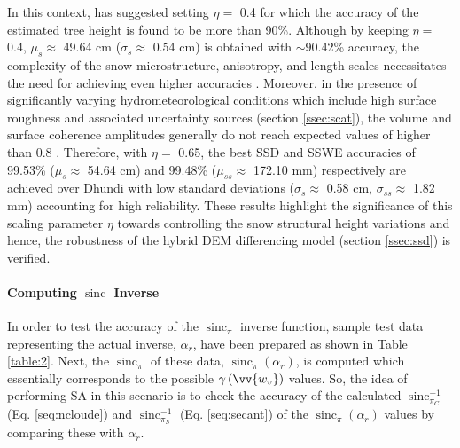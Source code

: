 \documentclass[review]{elsarticle}
\numberwithin{equation}{section}
\numberwithin{figure}{section}
\numberwithin{table}{section}
\DeclareMathOperator{\sinc}{sinc}
\begin{document}
In this context, \cite{Cloude2005} has suggested setting $\eta = $ 0.4 for which the accuracy of the estimated tree
height is found to be more than 90\%. Although by keeping $\eta = $ 0.4, $\mu_s \approx$ 49.64 cm ($\sigma_s \approx$ 0.54 cm) is obtained with $\sim$90.42\% accuracy, the complexity of the snow microstructure, anisotropy, and length scales necessitates the need for achieving even higher accuracies \citep{Leinss2016}. Moreover, in the presence of significantly varying hydrometeorological conditions which include high surface roughness and associated uncertainty sources (section \ref{ssec:scat}), the volume and surface coherence amplitudes generally do not reach expected values of higher than 0.8 \citep{Cloude2005, Kugler2015}. Therefore, with $\eta = $ 0.65, the best SSD and SSWE accuracies of 99.53\% ($\mu_s \approx$ 54.64 cm) and 99.48\% ($\mu_{ss} \approx$ 172.10 mm) respectively are achieved over Dhundi with low standard deviations ($\sigma_s \approx$ 0.58 cm, $\sigma_{ss} \approx$ 1.82 mm) accounting for high reliability. These results highlight the significance of this scaling parameter $\eta$ towards controlling the snow structural height variations \citep{Cloude2005, Cloude2010} and hence, the robustness of the hybrid DEM differencing model (section \ref{ssec:ssd}) is verified.

\paragraph*{Computing $\sinc$ Inverse}
In order to test the accuracy of the $\sinc_\pi$ inverse function, sample test data representing the actual inverse, $\alpha_r$, have been prepared as shown in Table \ref{table:2}. Next, the $\sinc_\pi$ of these data, $\sinc_{\pi}\left(\alpha_r\right)$, is computed which essentially corresponds to the possible $\gamma\left(\vv{w_v}\right)$ values. So, the idea of performing SA in this scenario is to check the accuracy of the calculated $\sinc_{\pi_C}^{-1}$ (Eq. \eqref{seq:ncloude}) and $\sinc_{\pi_S}^{-1}$ (Eq. \eqref{seq:secant}) of the $\sinc_{\pi}\left(\alpha_r\right)$ values by comparing these with $\alpha_r$.
\end{document}
